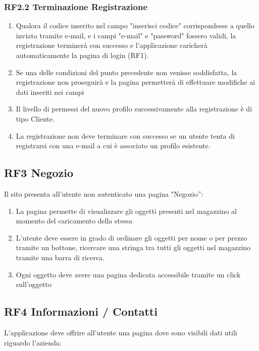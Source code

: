 \documentclass{report}
\begin{document}
\subsubsection*{RF2.2 Terminazione Registrazione}
\begin{enumerate}
	\item Qualora il codice inserito nel campo "inserisci codice" corrispondesse a quello inviato tramite e-mail, e i campi "e-mail" e "password" fossero validi, la registrazione terminerà con successo e l'applicazione caricherà automaticamente la pagina di login (RF1).
	\item Se una delle condizioni del punto precedente non venisse soddisfatta, la registrazione non proseguirà e la pagina permetterà di effettuare modifiche ai dati inseriti nei campi
	\item Il livello di permessi del nuovo profilo successivamente alla registrazione è di tipo Cliente.
	\item La registrazione non deve terminare con successo se un utente tenta di registrarsi con una e-mail a cui è associato un profilo esistente.

\end{enumerate}


\subsection*{RF3 Negozio}
Il sito presenta all’utente non autenticato una pagina "Negozio”: 

\begin{enumerate}
	\item La pagina permette di visualizzare gli oggetti presenti nel magazzino al momento del caricamento della stessa
	
	\item L’utente deve essere in grado di ordinare gli oggetti per nome o per prezzo tramite un bottone, ricercare una stringa tra tutti gli oggetti nel magazzino tramite una barra di ricerca.
	
	\item Ogni oggetto deve avere una pagina dedicata accessibile tramite un click sull’oggetto
\end{enumerate}


\subsection*{RF4 Informazioni / Contatti}
L’applicazione deve offrire all’utente una pagina dove sono visibili dati utili riguardo l'azienda:
\end{document}
